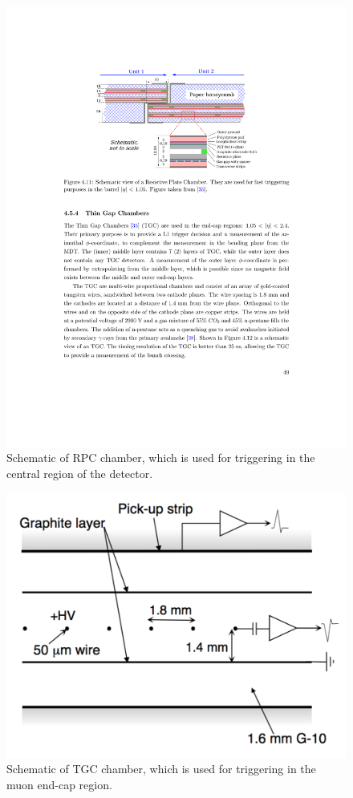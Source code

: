 \begin{figure}[h!]
  \centering
  \includegraphics[width=\hsize]{figures/Detector/muon_rpc.pdf}
  \caption{Schematic of RPC chamber, which is used for triggering in the central region of the detector.} 
  \label{fig:muon_rpc}
\end{figure}
\FloatBarrier



\begin{figure}[h!]
  \centering
  \includegraphics[width=\hsize]{figures/Detector/muon_tgc.pdf}
  \caption{Schematic of TGC chamber, which is used for triggering in the muon end-cap region.} 
  \label{fig:muon_tgc}
\end{figure}
\FloatBarrier

